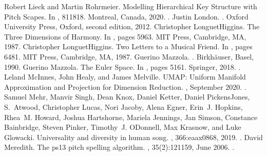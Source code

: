 \documentclass[letterpaper,10pt,english]{sphinxmanual}
\begin{document}
\begin{sphinxthebibliography}{10}
\sphinxAtStartPar
Robert Lieck and Martin Rohrmeier. Modelling Hierarchical Key Structure with Pitch Scapes. In , 811\textendash{}818. Montreal, Canada, 2020. .
\sphinxAtStartPar
Justin London. . Oxford University Press, Oxford, second edition, 2012.
\sphinxAtStartPar
Christopher Longuet\sphinxhyphen{}Higgins. The Three Dimensions of Harmony. In , pages 59\textendash{}63. MIT Press, Cambridge, MA, 1987.
\sphinxAtStartPar
Christopher Longuet\sphinxhyphen{}Higgins. Two Letters to a Musical Friend. In , pages 64\textendash{}81. MIT Press, Cambridge, MA, 1987.
\sphinxAtStartPar
Guerino Mazzola. . Birkhäuser, Basel, 1990.
\sphinxAtStartPar
Guerino Mazzola. The Euler Space. In , pages 51\textendash{}61. Springer, 2018. .
\sphinxAtStartPar
Leland McInnes, John Healy, and James Melville. UMAP: Uniform Manifold Approximation and Projection for Dimension Reduction. , September 2020. .
\sphinxAtStartPar
Samuel Mehr, Manvir Singh, Dean Knox, Daniel Ketter, Daniel Pickens\sphinxhyphen{}Jones, S. Atwood, Christopher Lucas, Nori Jacoby, Alena Egner, Erin J. Hopkins, Rhea M. Howard, Joshua Hartshorne, Mariela Jennings, Jan Simson, Constance Bainbridge, Steven Pinker, Timothy J. O\textquotesingle{}Donnell, Max Krasnow, and Luke Glowacki. Universality and diversity in human song. , 366:eaax0868, 2019. .
\sphinxAtStartPar
David Meredith. The ps13 pitch spelling algorithm. , 35(2):121\textendash{}159, June 2006. .

\end{sphinxthebibliography}
\end{document}

